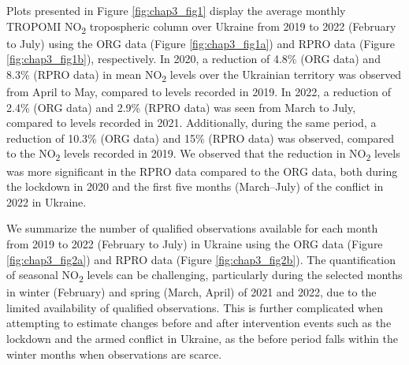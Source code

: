 Plots presented in Figure \ref{fig:chap3_fig1} display the average monthly TROPOMI NO\textsubscript{2} tropospheric column over Ukraine from 2019 to 2022 (February to July) using the ORG data (Figure \ref{fig:chap3_fig1a}) and RPRO data (Figure \ref{fig:chap3_fig1b}), respectively. In 2020, a reduction of 4.8\% (ORG data) and 8.3\% (RPRO data) in mean NO\textsubscript{2} levels over the Ukrainian territory was observed from April to May, compared to levels recorded in 2019. In 2022, a reduction of 2.4\% (ORG data) and 2.9\% (RPRO data) was seen from March to July, compared to levels recorded in 2021. Additionally, during the same period, a reduction of 10.3\% (ORG data) and 15\% (RPRO data) was observed, compared to the NO\textsubscript{2} levels recorded in 2019. We observed that the reduction in NO\textsubscript{2} levels was more significant in the RPRO data compared to the ORG data, both during the lockdown in 2020 and the first five months (March–July) of the conflict in 2022 in Ukraine.\par

We summarize the number of qualified observations available for each month from 2019 to 2022 (February to July) in Ukraine using the ORG data (Figure \ref{fig:chap3_fig2a}) and RPRO data (Figure \ref{fig:chap3_fig2b}). The quantification of seasonal NO\textsubscript{2} levels can be challenging, particularly during the selected months in winter (February) and spring (March, April) of 2021 and 2022, due to the limited availability of qualified observations. This is further complicated when attempting to estimate changes before and after intervention events such as the lockdown and the armed conflict in Ukraine, as the before period falls within the winter months when observations are scarce.\par

